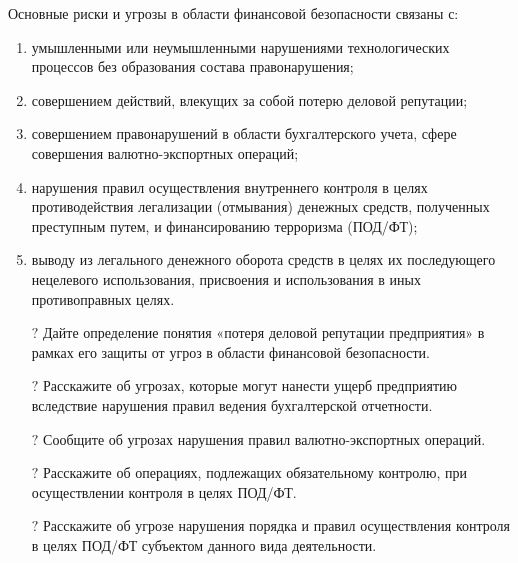 \documentclass[a4paper,12pt,fleqn]{article} %
\begin{document}
Основные риски и угрозы в области финансовой безопасности связаны с: 
\begin{enumerate}
	\item умышленными или неумышленными нарушениями технологических процессов без образования состава правонарушения;
	\item совершением действий, влекущих за собой потерю деловой репутации;
	\item совершением правонарушений в области бухгалтерского учета, сфере совершения валютно-экспортных операций; 
	\item нарушения правил осуществления внутреннего контроля в целях противодействия легализации (отмывания) денежных средств, полученных преступным путем, и финансированию терроризма (ПОД/ФТ); 
	\item выводу из легального денежного оборота средств в целях их последующего нецелевого использования, присвоения и использования в иных противоправных целях.   
\end{enumerate}


\begin{tcolorbox}[colback=yellow!40!red!5!,colframe=yellow!40!red,enforce breakable,%
	pad at break=1mm, title=Вопросы и задания для самоконтроля]
	\begin{itemize}
		\item[{\color{yellow!55!red}\Huge { $ ? $}} ]  Дайте определение понятия «потеря деловой репутации предприятия» в рамках его защиты от угроз в области финансовой безопасности.
		\item[{\color{yellow!55!red}\Huge {  $ ? $}} ] Расскажите об угрозах, которые могут нанести ущерб предприятию вследствие нарушения правил ведения бухгалтерской отчетности.
		\item[{\color{yellow!55!red}\Huge {  $ ? $}} ] Сообщите об угрозах нарушения правил валютно-экспортных операций.
		\item[{\color{yellow!55!red}\Huge {  $ ? $}} ] Расскажите об операциях, подлежащих обязательному контролю, при осуществлении контроля в целях ПОД/ФТ.
		\item[{\color{yellow!55!red}\Huge {  $ ? $}} ] Расскажите об угрозе нарушения порядка и правил осуществления контроля в целях ПОД/ФТ субъектом данного вида деятельности.
		
	\end{itemize}		
\end{tcolorbox}
\end{document}
